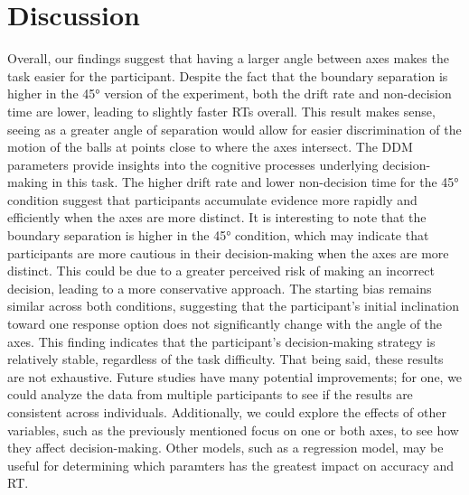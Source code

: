 \documentclass[12pt]{article}
\begin{document}
\section{Discussion}
Overall, our findings suggest that having a larger angle between axes makes the task easier for the participant. Despite the fact that the boundary separation is higher in the 45° version of the experiment, both the drift rate and non-decision time are lower, leading to slightly faster RTs overall. This result makes sense, seeing as a greater angle of separation would allow for easier discrimination of the motion of the balls at points close to where the axes intersect. The DDM parameters provide insights into the cognitive processes underlying decision-making in this task. The higher drift rate and lower non-decision time for the 45° condition suggest that participants accumulate evidence more rapidly and efficiently when the axes are more distinct. It is interesting to note that the boundary separation is higher in the 45° condition, which may indicate that participants are more cautious in their decision-making when the axes are more distinct. This could be due to a greater perceived risk of making an incorrect decision, leading to a more conservative approach. The starting bias remains similar across both conditions, suggesting that the participant's initial inclination toward one response option does not significantly change with the angle of the axes. This finding indicates that the participant's decision-making strategy is relatively stable, regardless of the task difficulty. That being said, these results are not exhaustive. Future studies have many potential improvements; for one, we could analyze the data from multiple participants to see if the results are consistent across individuals. Additionally, we could explore the effects of other variables, such as the previously mentioned focus on one or both axes, to see how they affect decision-making. Other models, such as a regression model, may be useful for determining which paramters has the greatest impact on accuracy and RT.



\end{document}
